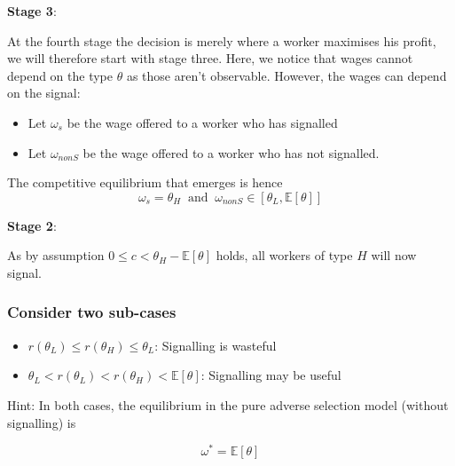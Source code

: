 \documentclass[11pt]{article}
\begin{document}
\textbf{Stage 3}: ~\smallskip

At the fourth stage the decision is merely where a worker maximises his profit, we will therefore start with stage three. Here, we notice that wages cannot depend on the type $\theta$ as those aren't observable. However, the wages can depend on the signal:

\begin{itemize}
	\item Let $\omega_s$ be the wage offered to a worker who has signalled
	\item Let $\omega_{nonS}$ be the wage offered to a worker who has not signalled.
\end{itemize}

The competitive equilibrium that emerges is hence
$$ \omega_s = \theta_H ~\text{ and }~ \omega_{nonS} \in \left[\theta_L, \mathbb{E}[\theta] \right] $$

\textbf{Stage 2}: ~\smallskip

As by assumption $0 \leq c < \theta_H - \mathbb{E}[\theta]$ holds, all workers of type $H$ will now signal.

\subsubsection{Consider two sub-cases}

\begin{itemize}
	\item $r(\theta_L) \leq r(\theta_H) \leq \theta_L$: Signalling is wasteful
	\item $\theta_L < r(\theta_L) < r(\theta_H) < \mathbb{E} \left[ \theta \right]$: Signalling may be useful
\end{itemize}

Hint: In both cases, the equilibrium in the pure adverse selection model (without signalling) is 

	$$ \omega^* = \mathbb{E}[\theta] $$
\end{document}
